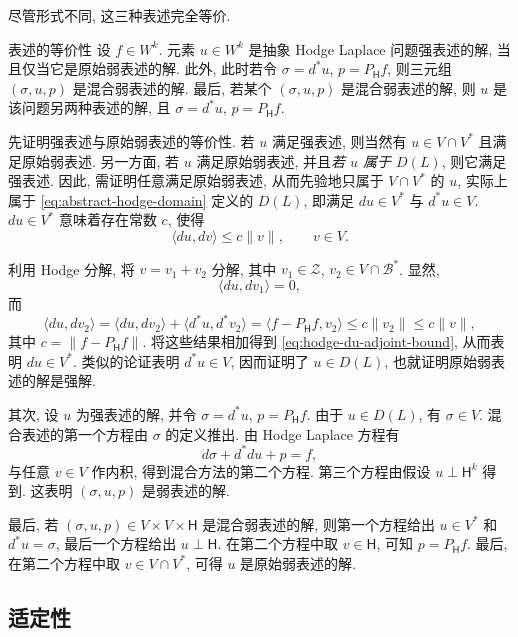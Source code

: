 尽管形式不同, 这三种表述完全等价.

\begin{Theorem}{{表述的等价性}}\label{thm:hodge-formulation-equivalence}
设 $f\in W^k$. 元素 $u\in W^k$ 是抽象 Hodge Laplace 问题强表述的解, 当且仅当它是原始弱表述的解. 此外, 此时若令 $\sigma=d^*u$, $p=P_{\mathsf H}f$, 则三元组 $(\sigma,u,p)$ 是混合弱表述的解. 最后, 若某个 $(\sigma,u,p)$ 是混合弱表述的解, 则 $u$ 是该问题另两种表述的解, 且 $\sigma=d^*u$, $p=P_{\mathsf H}f$.
\end{Theorem}

\begin{Proof}
先证明强表述与原始弱表述的等价性. 若 $u$ 满足强表述, 则当然有 $u\in V\cap V^*$ 且满足原始弱表述. 另一方面, 若 $u$ 满足原始弱表述, 并且\emph{若 $u$ 属于 $D(L)$}, 则它满足强表述. 因此, 需证明任意满足原始弱表述, 从而先验地只属于 $V\cap V^*$ 的 $u$, 实际上属于 \eqref{eq:abstract-hodge-domain} 定义的 $D(L)$, 即满足 $du\in V^*$ 与 $d^*u\in V$. $du\in V^*$ 意味着存在常数 $c$, 使得
\begin{equation}\label{eq:hodge-du-adjoint-bound}
\langle du,dv\rangle\leq c\|v\|,\qquad v\in V.
\end{equation}

利用 Hodge 分解, 将 $v=v_1+v_2$ 分解, 其中 $v_1\in\mathcal Z$, $v_2\in V\cap\mathcal B^*$. 显然,
\[
\langle du,dv_1\rangle=0,
\]
而
\[
\langle du,dv_2\rangle=\langle du,dv_2\rangle+\langle d^*u,d^*v_2\rangle=\langle f-P_{\mathsf H}f,v_2\rangle\leq c\|v_2\|\leq c\|v\|,
\]
其中 $c=\|f-P_{\mathsf H}f\|$. 将这些结果相加得到 \eqref{eq:hodge-du-adjoint-bound}, 从而表明 $du\in V^*$. 类似的论证表明 $d^*u\in V$, 因而证明了 $u\in D(L)$, 也就证明原始弱表述的解是强解.

其次, 设 $u$ 为强表述的解, 并令 $\sigma=d^*u$, $p=P_{\mathsf H}f$. 由于 $u\in D(L)$, 有 $\sigma\in V$. 混合表述的第一个方程由 $\sigma$ 的定义推出. 由 Hodge Laplace 方程有
\[
d\sigma+d^*du+p=f,
\]
与任意 $v\in V$ 作内积, 得到混合方法的第二个方程. 第三个方程由假设 $u\perp\mathsf H^k$ 得到. 这表明 $(\sigma,u,p)$ 是弱表述的解.

最后, 若 $(\sigma,u,p)\in V\times V\times\mathsf H$ 是混合弱表述的解, 则第一个方程给出 $u\in V^*$ 和 $d^*u=\sigma$, 最后一个方程给出 $u\perp\mathsf H$. 在第二个方程中取 $v\in\mathsf H$, 可知 $p=P_{\mathsf H}f$. 最后, 在第二个方程中取 $v\in V\cap V^*$, 可得 $u$ 是原始弱表述的解.
\end{Proof}

\subsection{适定性}\label{subsec:hodge-well-posedness}

